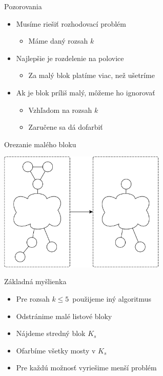 \documentclass[slovak]{beamer}
\begin{document}
\begin{frame}{Pozorovania}
    \begin{itemize}
        \item Musíme riešiť rozhodovací problém
        \begin{itemize}
            \item Máme daný rozsah $k$
        \end{itemize}
        \item Najlepšie je rozdelenie na polovice
        \begin{itemize}
            \item Za malý blok platíme viac, než ušetríme
        \end{itemize}
        \item Ak je blok príliš malý, môžeme ho ignorovať
        \begin{itemize}
            \item Vzhľadom na rozsah $k$
            \item Zaručene sa dá dofarbiť
        \end{itemize}
    \end{itemize}
\end{frame}

\begin{frame}{Orezanie malého bloku}
    \begin{center}
        \includegraphics[width=0.6\textwidth]{grafy/zanedbaj.pdf}
    \end{center}
\end{frame}

\begin{frame}{Základná myšlienka}
    \begin{itemize}
        \item Pre rozsah $k \leq 5$ použijeme iný algoritmus
        \item Odstránime malé listové bloky
        \item Nájdeme stredný blok $K_s$
        \item Ofarbíme všetky mosty v $K_s$
        \item Pre každú možnosť vyriešime menší problém
    \end{itemize}
\end{frame}
\end{document}

